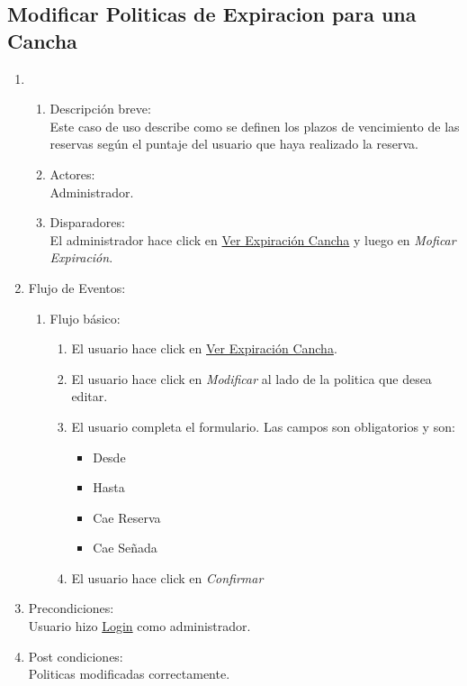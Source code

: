 \documentclass[a4paper,11pt]{article}
\begin{document}
\subsection{Modificar Politicas de Expiracion para una Cancha} 
\begin{enumerate}
    \item
    \begin{enumerate}
    \item Descripci\'on breve: \\
        Este caso de uso describe como se definen los plazos de vencimiento de
        las reservas seg\'un el puntaje del usuario que haya realizado la reserva.
    \item Actores: \\
        Administrador.
    \item Disparadores: \\
        El administrador hace click en \underline{Ver Expiraci\'on Cancha} y luego en \emph{Moficar Expiraci\'on}.
    \end{enumerate}
    \item Flujo de Eventos: 
    \begin{enumerate}
        \item Flujo b\'asico:
		\begin{enumerate}
            		\item El usuario hace click en \underline{Ver Expiraci\'on Cancha}.
            		\item El usuario hace click en \emph{Modificar} al lado de la politica que desea editar.
            		\item El usuario completa el formulario. Las campos son obligatorios y son:
            		\begin{itemize}
				\item Desde
				\item Hasta
				\item Cae Reserva
				\item Cae Se\~nada
			\end{itemize}
			\item El usuario hace click en \emph{Confirmar}
		\end{enumerate}
    \end{enumerate}
    \item Precondiciones: \\
        Usuario hizo \underline{Login} como administrador.
    \item Post condiciones: \\
        Politicas modificadas correctamente.
\end{enumerate}
\end{document}
